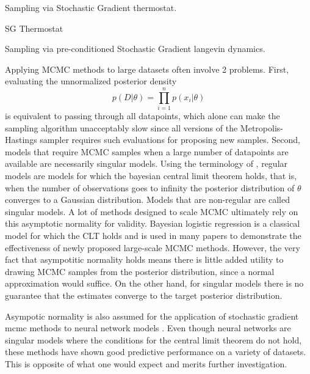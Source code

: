 \documentclass{book}
\begin{document}
\begin{enumerate}
Sampling via Stochastic Gradient thermostat. 
\begin{algorithm}
    \caption{SG Thermostat}
    \EndFor
\end{algorithm}
Sampling via pre-conditioned Stochastic Gradient langevin dynamics. 
\begin{algorithm}
    \caption{Preconditioned SGLD}
    \State{Initialize
    \For{t in 1:T}

\end{algorithm}

Applying MCMC methods to large datasets often involve 2 problems. First, evaluating the unnormalized posterior density
\[ p(D|\theta) = \prod_{i=1}^n p(x_i|\theta) \]
 is equivalent to passing through all datapoints, which alone can make the sampling algorithm unacceptably slow since all versions of the Metropolis-Hastings sampler requires such evaluations for proposing new samples. Second, models that require MCMC samples when a large number of datapoints are available are necessarily singular models. Using the terminology of \cite{watanabe2009algebraic}, regular models are models for which the bayesian central limit theorem \cite{le2012asymptotic} holds, that is, when the number of observations goes to infinity the posterior distribution of $\theta$ converges to a Gaussian distribution. Models that are non-regular are called singular models. A lot of methods designed to scale MCMC \cite{neiswanger2013asymptotically,scott2016bayes,} ultimately rely on this asymptotic normality for validity. Bayesian logistic regression is a classical model for which the CLT holds and is used in many papers to demonstrate the effectiveness of newly proposed large-scale MCMC methods. However, the very fact that asympotitic normality holds means there is little added utility to drawing MCMC samples from the posterior distribution, since a normal approximation would suffice. On the other hand, for singular models there is no guarantee that the estimates converge to the target posterior distribution. 

Asympotic normality is also assumed for the application of stochastic gradient mcmc methods to neural network models \cite{welling2011bayesian,chen2014stochastic,ahn2012bayesian,ding2014bayesian,ma2015complete}. Even though neural networks are singular models where the conditions for the central limit theorem do not hold, these methods have shown good predictive performance on a variety of datasets. This is opposite of what one would expect and merits further investigation.


\end{enumerate}
\end{document}
